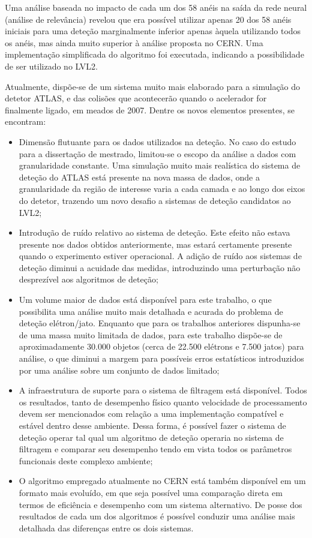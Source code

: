 Uma análise baseada no impacto de cada um dos 58 anéis na saída da rede neural
(análise de relevância) revelou que era possível utilizar apenas 20 dos 58
anéis iniciais para uma deteção marginalmente inferior apenas àquela
utilizando todos os anéis, mas ainda muito superior à análise proposta no
CERN. Uma implementação simplificada do algoritmo foi executada, indicando a
possibilidade de ser utilizado no LVL2.

Atualmente, dispõe-se de um sistema muito mais elaborado para a simulação do
detetor ATLAS, e das colisões que acontecerão quando o acelerador for
finalmente ligado, em meados de 2007. Dentre os novos elementos presentes, se
encontram:

\begin{itemize}
\item Dimensão flutuante para os dados utilizados na deteção. No caso do
estudo para a dissertação de mestrado, limitou-se o escopo da análise a dados
com granularidade constante. Uma simulação muito mais realística do sistema de
deteção do ATLAS está presente na nova massa de dados, onde a granularidade da
região de interesse varia a cada camada e ao longo dos eixos do detetor,
trazendo um novo desafio a sistemas de deteção candidatos ao LVL2;

\item Introdução de ruído relativo ao sistema de deteção. Este efeito não
estava presente nos dados obtidos anteriormente, mas estará certamente
presente quando o experimento estiver operacional. A adição de ruído aos
sistemas de deteção diminui a acuidade das medidas, introduzindo uma
perturbação não desprezível aos algoritmos de deteção;

\item Um volume maior de dados está disponível para este trabalho, o que
possibilita uma análise muito mais detalhada e acurada do problema de deteção
elétron/jato. Enquanto que para os trabalhos anteriores dispunha-se de uma
massa muito limitada de dados, para este trabalho dispõe-se de aproximadamente
30.000 objetos (cerca de 22.500 elétrons e 7.500 jatos) para análise, o que
diminui a margem para possíveis erros estatísticos introduzidos por uma
análise sobre um conjunto de dados limitado;

\item A infraestrutura de suporte para o sistema de filtragem está
disponível. Todos os resultados, tanto de desempenho físico quanto velocidade
de processamento devem ser mencionados com relação a uma implementação
compatível e estável dentro desse ambiente. Dessa forma, é possível fazer o
sistema de deteção operar tal qual um algoritmo de deteção operaria no sistema
de filtragem e comparar seu desempenho tendo em vista todos os parâmetros
funcionais deste complexo ambiente;

\item O algoritmo empregado atualmente no CERN está também disponível em um
formato mais evoluído, em que seja possível uma comparação direta em termos de
eficiência e desempenho com um sistema alternativo. De posse dos resultados de
cada um dos algoritmos é possível conduzir uma análise mais detalhada das
diferenças entre os dois sistemas.
\end{itemize}

